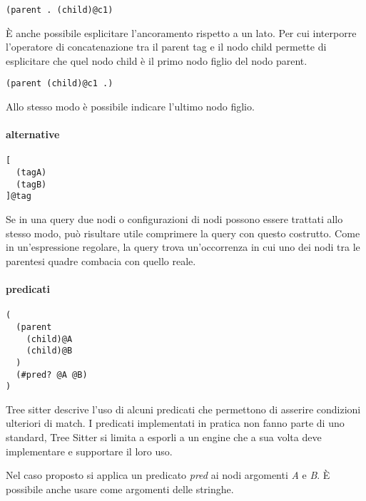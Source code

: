 \begin{lstlisting}
(parent . (child)@c1)
\end{lstlisting}

\`E anche possibile esplicitare l'ancoramento rispetto a un lato.
Per cui interporre l'operatore di concatenazione tra il parent tag e il nodo child permette di esplicitare che quel nodo child \`e il primo nodo figlio del nodo parent.

\begin{lstlisting}
(parent (child)@c1 .)
\end{lstlisting}

Allo stesso modo \`e possibile indicare l'ultimo nodo figlio.

\paragraph{alternative}

\begin{lstlisting}
[
  (tagA)
  (tagB)
]@tag
\end{lstlisting}

Se in una query due nodi o configurazioni di nodi possono essere trattati allo stesso modo, pu\`o risultare utile comprimere la query con questo costrutto.
Come in un'espressione regolare, la query trova un'occorrenza in cui uno dei nodi tra le parentesi quadre combacia con quello reale.


\paragraph{predicati}

\begin{lstlisting}
(
  (parent
    (child)@A
    (child)@B
  )
  (#pred? @A @B)
)
\end{lstlisting}

Tree sitter descrive l'uso di alcuni predicati che permettono di asserire condizioni ulteriori di match.
I predicati implementati in pratica non fanno parte di uno standard, Tree Sitter si limita a esporli a un engine che a sua volta deve implementare e supportare il loro uso.

Nel caso proposto si applica un predicato \emph{pred} ai nodi argomenti \emph{A} e \emph{B}.
\`E possibile anche usare come argomenti delle stringhe.
